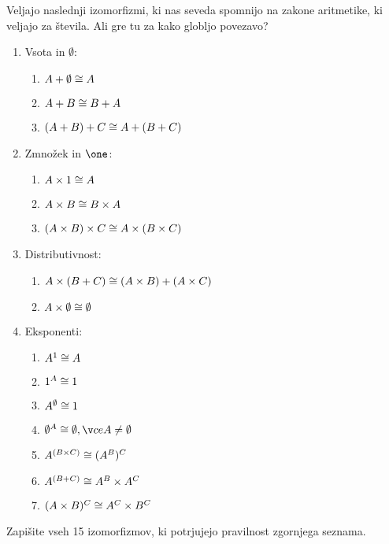 Veljajo naslednji izomorfizmi, ki nas seveda spomnijo na zakone aritmetike, ki
veljajo za števila. Ali gre tu za kako globljo povezavo?
%
\begin{enumerate}
\item Vsota in $\emptyset$:
  \begin{enumerate}
    \item $A + \emptyset \cong A$
    \item $A + B \cong B + A$
    \item $(A + B) + C \cong A + (B + C)$
  \end{enumerate}

\item Zmnožek in $\one$:
  \begin{enumerate}
    \item $A \times 1 \cong A$
    \item $A \times B \cong B \times A$
    \item $(A \times B) \times C \cong A \times (B \times C)$
  \end{enumerate}

\item Distributivnost:
  \begin{enumerate}
    \item $A \times (B + C) \cong (A \times B) + (A \times C)$
    \item $A \times \emptyset \cong \emptyset$
  \end{enumerate}

\item Eksponenti:
  \begin{enumerate}
    \item $A^1 \cong A$
    \item $1^A \cong 1$
    \item $A^{\emptyset }\cong 1$
    \item $\emptyset^A \iso \emptyset , če  A \neq \emptyset$
    \item $A^{(B \times C)} \cong (A^B)^C$
    \item $A^{(B + C)} \cong A^B \times A^C$
    \item $(A \times B)^C \cong A^C \times B^C$
  \end{enumerate}
\end{enumerate}

\begin{naloga}
  Zapišite vseh 15 izomorfizmov, ki potrjujejo pravilnost zgornjega seznama.
\end{naloga}
